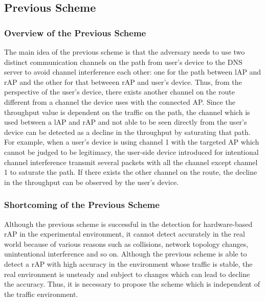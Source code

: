 \documentclass[conference]{IEEEtran}
\begin{document}
\subsection{Previous Scheme}
\subsubsection{Overview of the Previous Scheme}
The main idea of the previous scheme \cite{previous} is that the adversary needs to use two distinct communication channels on the path from user's device to the DNS server to avoid channel interference each other: one for the path between lAP and rAP and the other for that betweeen rAP and user's device.
Thus, from the perspective of the user's device, there exists another channel on the route different from a channel the device uses with the connected AP. 
Since the throughput value is dependent on the traffic on the path, the channel which is used between a lAP and rAP and not able to be seen directly from the user's device can be detected as a decline in the throughput by saturating that path.
For example, when a user's device is using channel 1 with the targeted AP which cannot be judged to be legitimacy, the user-side device introduced for intentional channel interference transmit several packets with all the channel except channel 1 to saturate the path.
If there exists the other channel on the route, the decline in the throughput can be observed by the user's device.

\subsubsection{Shortcoming of the Previous Scheme}
Although the previous scheme is successful in the detection for hardware-based rAP in the experimental environment, it cannot detect accurately in the real world because of various reasons such as collisions, network topology changes, unintentional interference and so on.
Although the previous scheme is able to detect a rAP with high accuracy in the environment whose traffic is stable, the real environment is unsteady and subject to changes which can lead to decline the accuracy.
Thus, it is necessary to propose the scheme which is independent of the traffic environment. 
\end{document}
